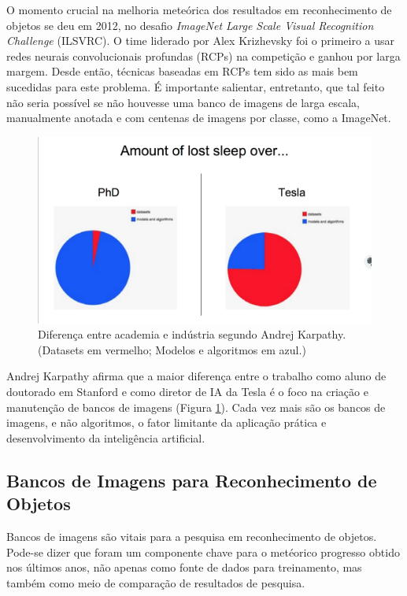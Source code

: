 \documentclass[conference]{IEEEtran}
\begin{document}
O momento crucial na melhoria meteórica dos resultados em reconhecimento de objetos se deu em 2012, no desafio \textit{ImageNet Large Scale Visual Recognition Challenge}  (ILSVRC)\cite{goodfellow}. O time liderado por Alex Krizhevsky foi o primeiro a usar redes neurais convolucionais profundas (RCPs) na competição e ganhou por larga margem\cite{alexnet}. Desde então, técnicas baseadas em RCPs tem sido as mais bem sucedidas para este problema. É importante salientar, entretanto, que tal feito não seria possível se não houvesse uma banco de imagens de larga escala, manualmente anotada e com centenas de imagens por classe, como a ImageNet.
\begin{figure}[ht!]
\begin{center}
\includegraphics[width=.7\columnwidth]{slide-karpathy.png}
\caption{Diferença entre academia e indústria segundo Andrej Karpathy\cite{karpathy}. (\small{Datasets em vermelho; Modelos e algoritmos em azul.})}\label{slide-karpathy}
\end{center}
\end{figure}
Andrej Karpathy\cite{karpathy} afirma que a maior diferença entre o trabalho como aluno de doutorado em Stanford e como diretor de IA da Tesla é o foco na criação e manutenção de bancos de imagens (Figura \ref{slide-karpathy}). Cada vez mais são os bancos de imagens, e não algoritmos, o fator limitante da aplicação prática e desenvolvimento da inteligência artificial. 

\subsection{Bancos de Imagens para Reconhecimento de Objetos}

Bancos de imagens são vitais para a pesquisa em reconhecimento de objetos. Pode-se dizer que foram um componente chave para o metéorico progresso obtido nos últimos anos, não apenas como fonte de dados para treinamento, mas também como meio de comparação de resultados de pesquisa\cite{bias}. 
\end{document}
